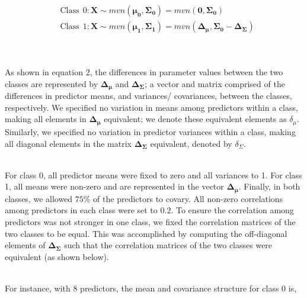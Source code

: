 \documentclass[AMA,STIX1COL,]{WileyNJD-v2}
\begin{document}
\begin{align}
&\mathrm{Class \ \  0:} \mathbf{X} \sim mvn( \pmb{\mu_0}, \pmb{\Sigma_0}) = mvn(\pmb{0}, \pmb{\Sigma_0}) \\
&\mathrm{Class \ \  1:} \mathbf{X} \sim mvn( \pmb{\mu_1}, \pmb{\Sigma_1}) = mvn(\pmb{\Delta_\mu}, \pmb{\Sigma_0} - \pmb{\Delta_\Sigma})
\end{align}\\
\strut \\
As shown in equation 2, the differences in parameter values between the
two classes are represented by \(\pmb{\Delta_\mu}\) and
\(\pmb{\Delta_\Sigma}\); a vector and matrix comprised of the
differences in predictor means, and variances/ covariances, between the
classes, respectively. We specified no variation in means among
predictors within a class, making all elements in \(\pmb{\Delta_\mu}\)
equivalent; we denote these equivalent elements as \(\delta_\mu\).
Similarly, we specified no variation in predictor variances within a
class, making all diagonal elements in the matrix
\(\pmb{\Delta_\Sigma}\) equivalent, denoted by \(\delta_\Sigma\).\\
\strut \\
For class 0, all predictor means were fixed to zero and all variances to
1. For class 1, all means were non-zero and are represented in the
vector \(\pmb{\Delta_\mu}\). Finally, in both classes, we allowed
\(75\)\% of the predictors to covary. All non-zero correlations among
predictors in each class were set to \(0.2\). To ensure the correlation
among predictors was not stronger in one class, we fixed the correlation
matrices of the two classes to be equal. This was accomplished by
computing the off-diagonal elements of \(\pmb{\Delta_\Sigma}\) such that
the correlation matrices of the two classes were equivalent (as shown
below).\\
\strut \\
For instance, with 8 predictors, the mean and covariance structure for
class 0 is,\\
\end{document}
